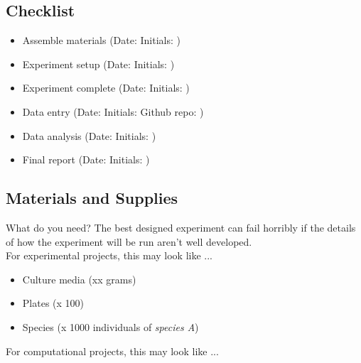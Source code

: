 \documentclass[a4paper,11pt]{article}
\begin{document}
\subsection*{Checklist}
 \begin{itemize}
   \item Assemble materials (Date: \hspace{1cm} Initials: \hspace{1cm})
   \item Experiment setup (Date: \hspace{1cm} Initials: \hspace{1cm})
   \item Experiment complete (Date: \hspace{1cm} Initials: \hspace{1cm})
   \item Data entry (Date: \hspace{1cm} Initials: \hspace{1cm}  Github repo: \hspace{5cm} )
   \item Data analysis (Date: \hspace{1cm} Initials: \hspace{1cm})
   \item Final report (Date: \hspace{1cm} Initials: \hspace{1cm})
 \end{itemize}






\subsection*{Materials and Supplies}
What do you need? The best designed experiment can fail horribly if the details of how the experiment will be run aren't well developed.\\ 

For experimental projects, this may look like ...

 \begin{itemize}
  \item Culture media (xx grams)
  \item Plates (x 100)
  \item Species (x 1000 individuals of \textit{species A})
 \end{itemize}


For computational projects, this may look like ...
\end{document}
